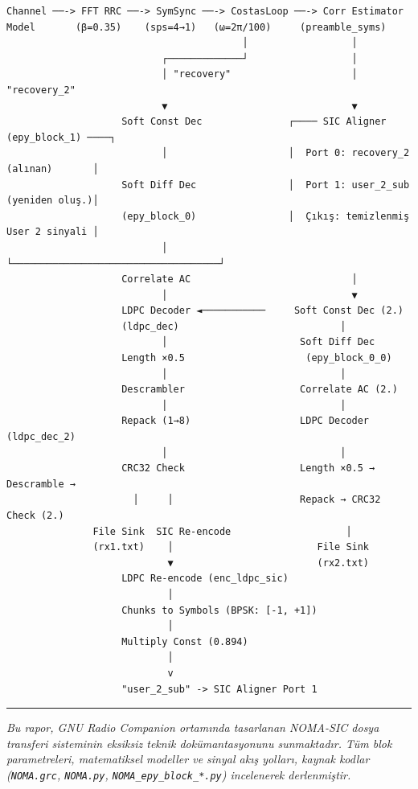 \documentclass[
]{IEEEtran}
\begin{document}
\begin{verbatim}
Channel ──-> FFT RRC ──-> SymSync ──-> CostasLoop ──-> Corr Estimator
Model       (β=0.35)    (sps=4→1)   (ω=2π/100)     (preamble_syms)
                                         │                  │
                           ┌─────────────┘                  │
                           │ "recovery"                     │ "recovery_2"
                           ▼                                ▼
                    Soft Const Dec               ┌──── SIC Aligner (epy_block_1) ────┐
                           │                     │  Port 0: recovery_2 (alınan)       │
                    Soft Diff Dec                │  Port 1: user_2_sub (yeniden oluş.)│
                    (epy_block_0)                │  Çıkış: temizlenmiş User 2 sinyali │
                           │                     └────────────────────────────────────┘
                    Correlate AC                            │
                           │                                ▼
                    LDPC Decoder ◄───────────     Soft Const Dec (2.)
                    (ldpc_dec)                            │
                           │                       Soft Diff Dec
                    Length ×0.5                     (epy_block_0_0)
                           │                              │
                    Descrambler                    Correlate AC (2.)
                           │                              │
                    Repack (1→8)                   LDPC Decoder (ldpc_dec_2)
                           │                              │
                    CRC32 Check                    Length ×0.5 → Descramble →
                      │     │                      Repack → CRC32 Check (2.)
               File Sink  SIC Re-encode                    │
               (rx1.txt)    │                         File Sink
                            ▼                         (rx2.txt)
                    LDPC Re-encode (enc_ldpc_sic)
                            │
                    Chunks to Symbols (BPSK: [-1, +1])
                            │
                    Multiply Const (0.894)
                            │
                            v
                    "user_2_sub" -> SIC Aligner Port 1
\end{verbatim}

\begin{center}\rule{0.5\linewidth}{0.5pt}\end{center}

\emph{Bu rapor, GNU Radio Companion ortamında tasarlanan NOMA-SIC dosya
transferi sisteminin eksiksiz teknik dokümantasyonunu sunmaktadır. Tüm
blok parametreleri, matematiksel modeller ve sinyal akış yolları, kaynak
kodlar (\texttt{NOMA.grc}, \texttt{NOMA.py},
\texttt{NOMA\_epy\_block\_*.py}) incelenerek derlenmiştir.}
\end{document}
